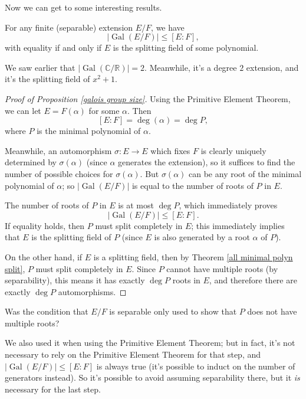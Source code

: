 Now we can get to some interesting results. 

\begin{proposition} \label{galois group size}
    For any finite (separable) extension $E/F$, we have \[\lvert\operatorname{Gal}(E/F)\rvert \leq [E : F],\] with equality if and only if $E$ is the splitting field of some polynomial. 
\end{proposition}

\begin{example}
    We saw earlier that $\lvert \operatorname{Gal}(\mathbb{C}/\mathbb{R}) \rvert = 2$. Meanwhile, it's a degree $2$ extension, and it's the splitting field of $x^2 + 1$. 
\end{example}

\begin{proof}[Proof of Proposition \ref{galois group size}]
    Using the Primitive Element Theorem, we can let $E = F(\alpha)$ for some $\alpha$. Then \[[E : F] = \deg(\alpha) = \deg P,\] where $P$ is the minimal polynomial of $\alpha$. 
    
    Meanwhile, an automorphism $\sigma : E \to E$ which fixes $F$ is clearly uniquely determined by $\sigma(\alpha)$ (since $\alpha$ generates the extension), so it suffices to find the number of possible choices for $\sigma(\alpha)$. But $\sigma(\alpha)$ can be any root of the minimal polynomial of $\alpha$; so $\lvert\operatorname{Gal}(E/F)\rvert$ is equal to the number of roots of $P$ in $E$. 
    
    The number of roots of $P$ in $E$ is at most $\deg P$, which immediately proves \[\lvert\operatorname{Gal}(E/F)\rvert \leq [E : F].\] If equality holds, then $P$ must split completely in $E$; this immediately implies that $E$ is the splitting field of $P$ (since $E$ is also generated by a root $\alpha$ of $P$). 

    On the other hand, if $E$ is a splitting field, then by Theorem \ref{all minimal polyn split}, $P$ must split completely in $E$. Since $P$ cannot have multiple roots (by separability), this means it has exactly $\deg P$ roots in $E$, and therefore there are exactly $\deg P$ automorphisms. 
\end{proof}

\begin{question}
Was the condition that $E/F$ is separable only used to show that $P$ does not have multiple roots?
\end{question}

\begin{ans}
    We also used it when using the Primitive Element Theorem; but in fact, it's not necessary to rely on the Primitive Element Theorem for that step, and $\lvert\operatorname{Gal}(E/F)\rvert \leq [E : F]$ is always true (it's possible to induct on the number of generators instead). So it's possible to avoid assuming separability there, but it \emph{is} necessary for the last step. 
\end{ans}


